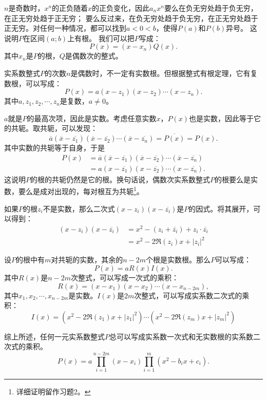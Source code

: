 \documentclass[12pt,UTF8]{ctexbook}
\theoremstyle{definition}
\theoremstyle{plain}
\begin{document}
\begin{appendix}
$n$是奇数时，$x^n$的正负随着$x$的正负变化，因此$a_nx^n$要么在负无穷处趋于负无穷，在正无穷处趋于正无穷；
要么反过来，在负无穷处趋于负无穷，在正无穷处趋于正无穷。对任何一种情况，都可以找到$a<0<b$，使得$P(a)$和$P(b)$异号。
这说明$P$在区间$(a;b)$上有根。
我们可以把$P$写成：
$$ P(x) = (x - x_n)Q(x).$$
其中$x_n$是$P$的根，$Q$是偶数次的整式。

实系数整式$P$的次数$n$是偶数时，不一定有实数根。但根据整式有根定理，它有复数根，可以写成：
$$ P(x) = a(x - z_1)(x - z_2)\cdots(x - z_n).$$
其中$a, z_1, z_2,\cdots, z_n$是复数，$a\neq 0$。

$a$就是$P$的最高次项，因此是实数。考虑任意实数$x$，$P(x)$也是实数，因此等于它的共轭。取共轭，可以发现：
$$ \overline{a}(\overline{x} - \overline{z_1})(\overline{x} - \overline{z_2})\cdots(\overline{x} - \overline{z_n}) = \overline{P(x)} = P(x).$$
其中实数的共轭等于自身，于是
\begin{align*}
    P(x) &= \overline{a}(\overline{x} - \overline{z_1})(\overline{x} - \overline{z_2})\cdots(\overline{x} - \overline{z_n}) \\
    &= a(x - \overline{z_1})(x - \overline{z_2})\cdots(x - \overline{z_n}). 
\end{align*}
这说明$P$的根的共轭仍然是它的根。换句话说，偶数次实系数整式$P$的根要么是实数，要么是成对出现的，每对根互为共轭\footnote{详细证明留作习题2。}。
  
如果$P$的根$z_i$不是实数，那么二次式$(x - z_i)(x - \overline{z_i})$是$P$的因式。将其展开，可以得到：
\begin{align*}
    (x - z_i)(x - \overline{z_i}) &= x^2 - (z_i + \overline{z_i}) + z_i\cdot\overline{z_i} \\
    &= x^2 - 2\Re(z_i)x + |z_i|^2
\end{align*}

设$P$的根中有$m$对共轭的实数，其余的$n-2m$个根是实数根。那么$P$可以写成：
$$ P(x) = aR(x)I(x).$$
其中$R(x)$是$n-2m$次整式，可以写成一次式的乘积：
$$ R(x) = (x - x_1)(x - x_2)\cdots(x - x_{n-2m}), $$
其中$x_1, x_2, \cdots, x_{n-2m}$是实数。$I(x)$是$2m$次整式，可以写成实系数二次式的乘积：
$$ I(x) = (x^2 - 2\Re(z_1)x + |z_1|^2) \cdots (x^2 - 2\Re(z_m)x + |z_m|^2)$$

综上所述，任何一元实系数整式$P$总可以写成实系数一次式和无实数根的实系数二次式的乘积。
$$ P(x) = a\prod_{i=1}^{n-2m}(x - x_i) \prod_{i=1}^m (x^2 - b_ix + c_i). $$


\end{appendix}
\end{document}
